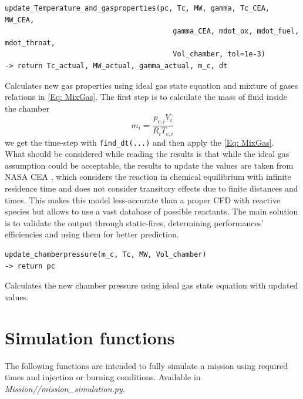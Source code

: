 \begin{verbatim}
update_Temperature_and_gasproperties(pc, Tc, MW, gamma, Tc_CEA, MW_CEA, 
										gamma_CEA, mdot_ox, mdot_fuel, mdot_throat, 
										Vol_chamber, tol=1e-3)
-> return Tc_actual, MW_actual, gamma_actual, m_c, dt
\end{verbatim}
\hspace*{2em} Calculates new gas properties using ideal gas state equation and mixture of gases relations in \ref{Eq: MixGas}. The first step is to calculate the mass of fluid inside the chamber
\begin{equation}
    m_i=\frac{p_{c,i}V_i}{R_iT_{c,i}}
\end{equation}
we get the time-step with \verb|find_dt(...)| and then apply the \ref{Eq: MixGas}.\\
What should be considered while reading the results is that while the ideal gas assumption could be acceptable, the results to update the values are taken from NASA CEA \cite{NASACEA}, which considers the reaction in chemical equilibrium with infinite residence time and does not consider transitory effects due to finite distances and times. This makes this model less-accurate than a proper CFD with reactive species but allows to use a vast database of possible reactants. The main solution is to validate the output through static-fires, determining performances' efficiencies and using them for better prediction.

\begin{verbatim}
update_chamberpressure(m_c, Tc, MW, Vol_chamber)
-> return pc
\end{verbatim}
\hspace*{2em} Calculates the new chamber pressure using ideal gas state equation with updated values.

\section{Simulation functions}
The following functions are intended to fully simulate a mission using required times and injection or burning conditions. Available in \textit{Mission//mission\_simulation.py}.


